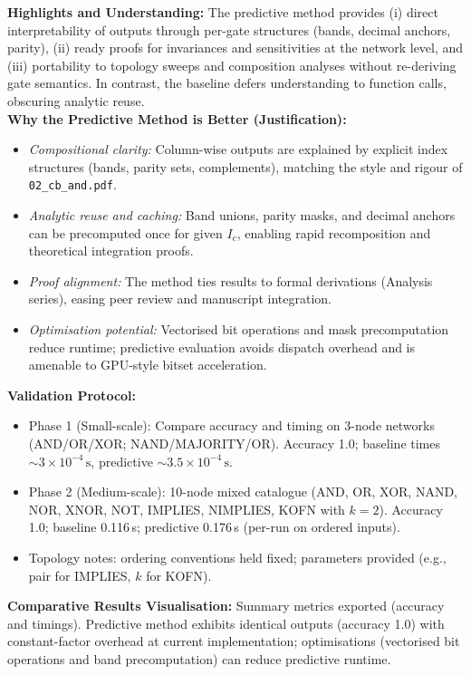 \documentclass{article}
\begin{document}
\textbf{Highlights and Understanding:} The predictive method provides (i) direct interpretability of outputs through per-gate structures (bands, decimal anchors, parity), (ii) ready proofs for invariances and sensitivities at the network level, and (iii) portability to topology sweeps and composition analyses without re-deriving gate semantics. In contrast, the baseline defers understanding to function calls, obscuring analytic reuse.\\
\textbf{Why the Predictive Method is Better (Justification):}
\begin{itemize}
 \item \emph{Compositional clarity:} Column-wise outputs are explained by explicit index structures (bands, parity sets, complements), matching the style and rigour of \texttt{02\_cb\_and.pdf}.
 \item \emph{Analytic reuse and caching:} Band unions, parity masks, and decimal anchors can be precomputed once for given \(I_c\), enabling rapid recomposition and theoretical integration proofs.
 \item \emph{Proof alignment:} The method ties results to formal derivations (Analysis series), easing peer review and manuscript integration.
 \item \emph{Optimisation potential:} Vectorised bit operations and mask precomputation reduce runtime; predictive evaluation avoids dispatch overhead and is amenable to GPU-style bitset acceleration.
\end{itemize}
\textbf{Validation Protocol:}
\begin{itemize}
 \item Phase 1 (Small-scale): Compare accuracy and timing on 3-node networks (AND/OR/XOR; NAND/MAJORITY/OR). Accuracy 1.0; baseline times \(\sim\!3\times10^{-4}\,\mathrm{s}\), predictive \(\sim\!3.5\times10^{-4}\,\mathrm{s}\).
 \item Phase 2 (Medium-scale): 10-node mixed catalogue (AND, OR, XOR, NAND, NOR, XNOR, NOT, IMPLIES, NIMPLIES, KOFN with \(k=2\)). Accuracy 1.0; baseline 0.116\,s; predictive 0.176\,s (per-run on ordered inputs).
 \item Topology notes: ordering conventions held fixed; parameters provided (e.g., pair for IMPLIES, \(k\) for KOFN).
\end{itemize}
\textbf{Comparative Results Visualisation:} Summary metrics exported (accuracy and timings). Predictive method exhibits identical outputs (accuracy 1.0) with constant-factor overhead at current implementation; optimisations (vectorised bit operations and band precomputation) can reduce predictive runtime.\\
\end{document}
